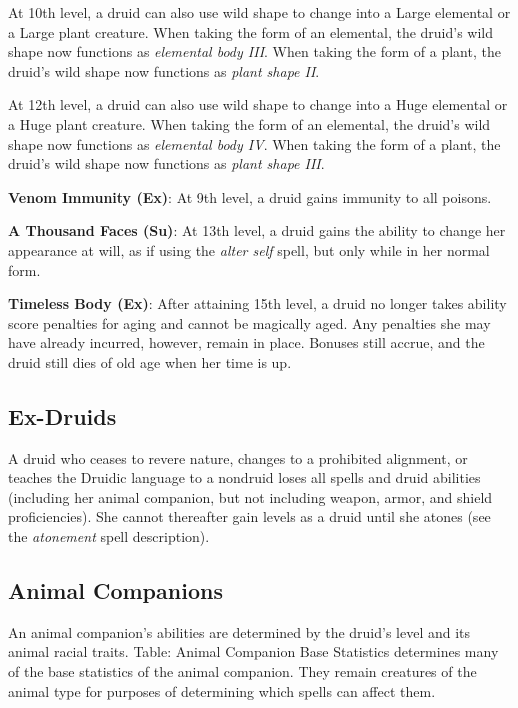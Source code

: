 At 10th level, a druid can also use wild shape to change into a Large elemental or a Large plant creature. When taking the form of an elemental, the druid's wild shape now functions as \textit{elemental body III}. When taking the form of a plant, the druid's wild shape now functions as \textit{plant shape II}.
				
At 12th level, a druid can also use wild shape to change into a Huge elemental or a Huge plant creature. When taking the form of an elemental, the druid's wild shape now functions as \textit{elemental body IV}. When taking the form of a plant, the druid's wild shape now functions as \textit{plant shape III}.
				
\textbf{Venom Immunity (Ex)}: At 9th level, a druid gains immunity to all poisons. 
				
\textbf{A Thousand Faces (Su)}: At 13th level, a druid gains the ability to change her appearance at will, as if using the \textit{alter self} spell, but only while in her normal form.
				
\textbf{Timeless Body (Ex)}: After attaining 15th level, a druid no longer takes ability score penalties for aging and cannot be magically aged. Any penalties she may have already incurred, however, remain in place. Bonuses still accrue, and the druid still dies of old age when her time is up.
				
\subsection{Ex-Druids}

				
A druid who ceases to revere nature, changes to a prohibited alignment, or teaches the Druidic language to a nondruid loses all spells and druid abilities (including her animal companion, but not including weapon, armor, and shield proficiencies). She cannot thereafter gain levels as a druid until she atones (see the \textit{atonement} spell description).
				
\subsection{Animal Companions}

				
An animal companion's abilities are determined by the druid's level and its animal racial traits. Table: Animal Companion Base Statistics determines many of the base statistics of the animal companion. They remain creatures of the animal type for purposes of determining which spells can affect them.
				
